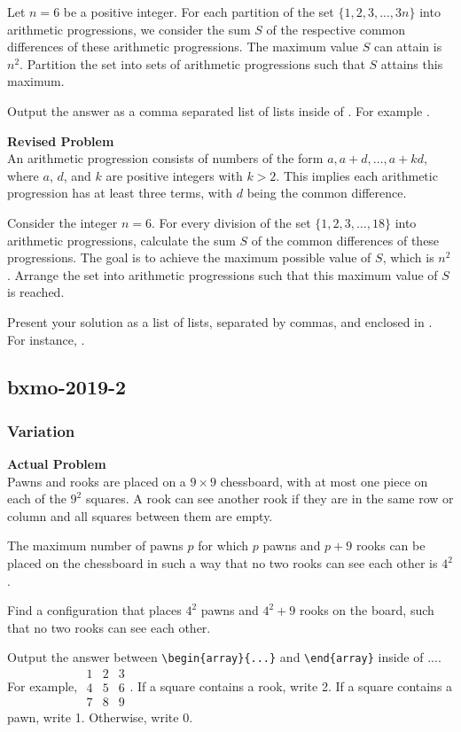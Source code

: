 Let $n = 6$ be a positive integer. For each partition of the set $\{1, 2, 3, ..., 3n\}$ into arithmetic progressions, we consider the sum $S$ of the respective common differences of these arithmetic progressions. The maximum value $S$ can attain is $n^2$. Partition the set into sets of arithmetic progressions such that $S$ attains this maximum.

Output the answer as a comma separated list of lists inside of . For example .

\textbf{Revised Problem}\\
An arithmetic progression consists of numbers of the form ${a, a+d, \ldots, a+kd}$, where $a$, $d$, and $k$ are positive integers with $k > 2$. This implies each arithmetic progression has at least three terms, with $d$ being the common difference.

Consider the integer $n = 6$. For every division of the set $\{1, 2, 3, \ldots, 18\}$ into arithmetic progressions, calculate the sum $S$ of the common differences of these progressions. The goal is to achieve the maximum possible value of $S$, which is $n^2$. Arrange the set into arithmetic progressions such that this maximum value of $S$ is reached.

Present your solution as a list of lists, separated by commas, and enclosed in . For instance, .

\subsection{bxmo-2019-2}
\subsubsection{Variation}
\textbf{Actual Problem}\\
Pawns and rooks are placed on a $9 \times 9$ chessboard, with at most one piece on each of the $9^2$ squares. A rook can see another rook if they are in the same row or column and all squares between them are empty. 

The maximum number of pawns $p$ for which $p$ pawns and $p + 9$ rooks can be placed on the chessboard in such a way that no two rooks can see each other is $4^2$. 

Find a configuration that places $4^2$ pawns and $4^2 + 9$ rooks on the board, such that no two rooks can see each other.

Output the answer between \verb|\begin{array}{...}| and \verb|\end{array}| inside of $\boxed{...}$. For example, $\boxed{\begin{array}{ccc}1 & 2 & 3 \\ 4 & 5 & 6 \\ 7 & 8 & 9\end{array}}$.
If a square contains a rook, write 2. If a square contains a pawn, write 1. Otherwise, write 0.

